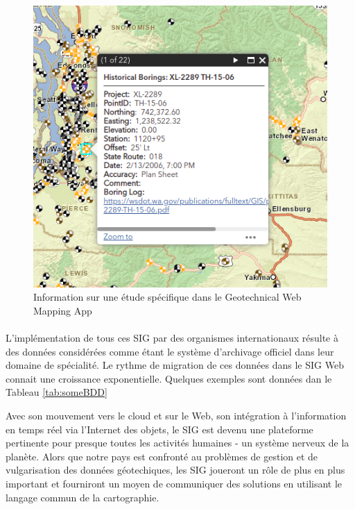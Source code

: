 \begin{figure}[t]
    \centering
    \includegraphics[width=1\textwidth]{images/Contexte/wash.png}
    \caption{Information sur une étude spécifique dans le Geotechnical Web Mapping App}
    \label{fig:wash}
\end{figure}

\paragraph{}
L’implémentation de tous ces SIG par des organismes internationaux résulte à des données considérées 
comme étant le système d’archivage officiel dans leur domaine de spécialité.
Le rythme de migration de ces données dans le SIG Web connait une croissance exponentielle. 
Quelques exemples sont données dan le Tableau \ref{tab:someBDD}
\par
Avec son mouvement vers le cloud et sur le Web, son intégration à l'information 
en temps réel via l'Internet des objets, le SIG est devenu une plateforme 
pertinente pour presque toutes les activités humaines - un système nerveux de 
la planète. Alors que notre pays est confronté au problèmes de gestion et de vulgarisation 
des données géotechiques, les SIG joueront un rôle de plus 
en plus important et 
fourniront un moyen de communiquer des solutions en utilisant le langage commun de 
la cartographie.

